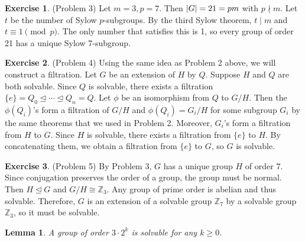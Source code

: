 \documentclass[12pt, psamsfonts]{amsart}
\newtheorem{lem}[thm]{Lemma}
\theoremstyle{definition}
\newtheorem*{exer}{Exercise}
\theoremstyle{remark}
\numberwithin{equation}{section}
\begin{document}
\begin{exer}{(Problem 3)}
  Let $m = 3, p = 7$.
  Then $\abs{G} = 21 = pm$ with $p \nmid m$.
  Let $t$ be the number of Sylow $p$-subgroups.
  By the third Sylow theorem, $t \mid m$ and $t \equiv 1 \pmod p$.
  The only number that satisfies this is 1, so every group of order 21 has a unique Sylow 7-subgroup.
\end{exer}

\begin{exer}{(Problem 4)}
  Using the same idea as Problem 2 above, we will construct a filtration.
  Let $G$ be an extension of $H$ by $Q$.
  Suppose $H$ and $Q$ are both solvable.
  Since $Q$ is solvable, there exists a filtration $\{ e \} = Q_0 \trianglelefteq \cdots \trianglelefteq Q_n = Q$.
  Let $\phi$ be an isomorphism from $Q$ to $G / H$.
  Then the $\phi(Q_i)$'s form a filtration of $G / H$ and $\phi(Q_i) = G_i / H$ for some subgroup $G_i$ by the same theorems that we used in Problem 2.
  Moreover, $G_i$'s form a filtration from $H$ to $G$.
  Since $H$ is solvable, there exists a filtration from $\{ e \}$ to $H$.
  By concatenating them, we obtain a filtration from $\{ e \}$ to $G$, so $G$ is solvable.
\end{exer}

\begin{exer}{(Problem 5)}
  By Problem 3, $G$ has a unique group $H$ of order 7.
  Since conjugation preserves the order of a group, the group must be normal.
  Then $H \trianglelefteq G$ and $G / H \cong \mathbb{Z}_3$.
  Any group of prime order is abelian and thus solvable.
  Therefore, $G$ is an extension of a solvable group $\mathbb{Z}_7$ by a solvable group $\mathbb{Z}_3$, so it must be solvable.
\end{exer}

\begin{lem}\label{twothree}
  A group of order $3 \cdot 2^k$ is solvable for any $k \geq 0$.
\end{lem}
\end{document}
